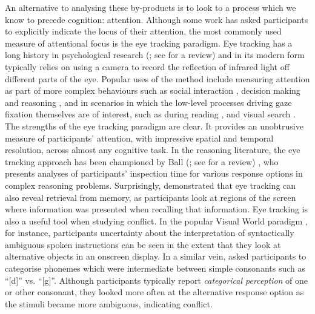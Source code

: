 An alternative to analysing these by-products
is to look to a process which we know to precede cognition: attention.
Although some work \citep[i.e.][]{Evans1996} has asked participants
to explicitly indicate the locus of their attention,
the most commonly used measure of attentional focus
is the eye tracking paradigm.
Eye tracking has a long history in psychological research
(\citealp{Ball2014, Mele2012, Huey1908, Yarbus1967};
see \citealp{Duchowski2007} for a review)
and in its modern form typically relies on
using a camera to record the reflection of infrared light
off different parts of the eye.
Popular uses of the method include
measuring attention as part of more complex behaviours
such as social interaction \citep[i.e.][]{Hanley2014},
decision making \citep{Krajbich2011}
and reasoning \citep{Ball2014},
and in scenarios in which the low-level processes
driving gaze fixation themselves are of interest,
such as during reading \citep{Rayner1998},
and visual search \citep{Treisman1980}.
The strengths of the eye tracking paradigm are clear.
It provides an unobtrusive measure of participants' attention,
with impressive spatial and temporal resolution,
across almost any cognitive task.
In the reasoning literature, the eye tracking approach
has been championed by Ball 
(\citealp{Evans2010,Stupple2008,Ball2006,Ball2005,Ball2003};
see \citealp{Ball2014} for a review)
,
who presents analyses of participants' inspection time
for various response options in complex reasoning problems.
Surprisingly, \citet{Richardson2000} demonstrated
that eye tracking can also reveal retrieval from memory,
as participants look at regions of the screen
where information was presented when recalling that information.
Eye tracking is also a useful tool when studying conflict.
In the popular Visual World paradigm
\citep{Huettig2011,Allopena1998,Tanenhaus1995},
for instance, participants uncertainty about
the interpretation of syntactically ambiguous spoken instructions
can be seen in the extent that they look at
alternative objects in an onscreen display.
In a similar vein, \citet{McMurray2008} asked participants to 
categorise phonemes which were intermediate between
simple consonants such as ``[d]'' vs. ``[g]''.
Although participants typically report
\emph{categorical perception} of one or other consonant,
they looked more often at the alternative response option
as the stimuli became more ambiguous, indicating conflict. 
 

